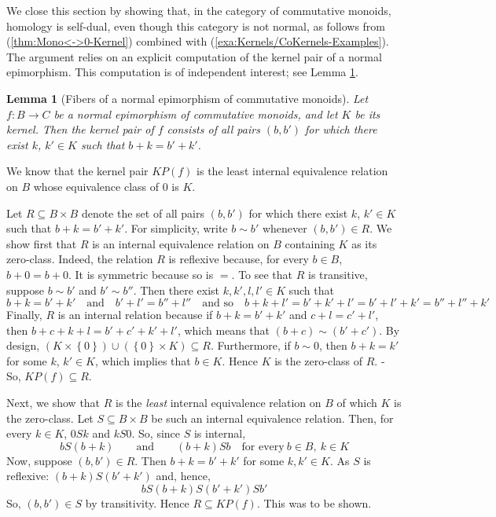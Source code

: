 \documentclass [12pt,oneside]{book}%
\makeatletter
\theoremstyle{captionstyle}  %
\newtheorem{lemma}[theorem]{Lemma}
\renewenvironment{proof}[1][\proofname]{\vspace{-2ex}\par       %
	\pushQED{\qed}%
	\normalfont \topsep6\p@\@plus6\p@\relax
	\trivlist
	\item[\hskip\labelsep
	            \color{proofcaption}\bfseries                %
	            #1\@addpunct{\quad}]\ignorespaces
}{%
	\popQED\endtrivlist\@endpefalse
}
\newcommand{\from}{\colon}				%
\newcommand{\Set}[1]{\left\{#1\right\}}		%
\newcommand{\union}{\cup}									%
\newcommand{\ZeroObject}{0}                           %
\newcommand{\Prdct}[2]{#1 \times #2}	 	%
\newcommand{\KrnlPr}[1]{\textit{KP}\left(#1\right)}			%
\makeatother
\begin{document}
We close this section by showing that, in the category of commutative monoids, homology is self-dual, even though this category is not normal, as follows from (\ref{thm:Mono<->0-Kernel}) combined with (\ref{exa:Kernels/CoKernels-Examples}). The argument relies on an explicit computation of the kernel pair of a normal epimorphism. This computation is of independent interest; see Lemma \ref{thm:FibersNormalEpiMorphismCommutativeMonoids}.

\begin{lemma}[Fibers of a normal epimorphism of commutative monoids]
    \label{thm:FibersNormalEpiMorphismCommutativeMonoids}
    Let $f\from B\to C$ be a normal epimorphism of commutative monoids, and let $K$	be its kernel. Then the kernel pair of $f$ consists of all pairs $(b,b')$ for which there exist $k$, $k'\in K$ such that $b+k=b'+k'$.
\end{lemma}
\begin{proof}
    We know that the kernel pair $\KrnlPr{f}$ is the least internal equivalence relation on $B$ whose equivalence class of $\ZeroObject$ is $K$.

    Let $R\subseteq \Prdct{B}{B}$ denote the set of all pairs $(b,b')$ for which there exist $k$, $k'\in K$ such that $b+k=b'+k'$. For simplicity, write $b\sim b'$ whenever $(b,b')\in R$. We show first that $R$ is an internal equivalence relation on $B$ containing $K$ as its zero-class. Indeed, the relation $R$ is reflexive because, for every $b\in B$, $b+0=b+0$. It is symmetric because so is $=$. To see that $R$ is transitive, suppose $b\sim b'$ and $b'\sim b''$. Then there exist $k,k',l,l'\in K$ such that
    \begin{equation*}
        b+k=b'+k'  \quad \text{and}\quad b'+l'=b''+l''  \quad \text{and so}\quad b+k+l'=b'+k'+l'=b'+l'+k'=b''+l''+k'
    \end{equation*}
    Finally, $R$ is an internal relation because if $b+k=b'+k'$ and $c+l=c'+l'$, then $b+c+k+l=b'+c'+k'+l'$, which means that $(b+c)\sim (b'+c')$. By design, $(\Prdct{K}{\Set{\ZeroObject}})\union (\Prdct{\Set{\ZeroObject}}{K})\subseteq R$. Furthermore, if $b\sim 0$, then $b+k=k'$ for some $k$, $k'\in K$, which implies that $b\in K$. Hence $K$ is the zero-class of $R$. - So, $\KrnlPr{f}\subseteq R$.

    Next, we show that $R$ is the \emph{least} internal equivalence relation on $B$ of which $K$ is the zero-class. Let $S\subseteq \Prdct{B}{B}$ be such an internal equivalence relation. Then, for every $k\in K$, $0Sk$ and $kS0$. So, since $S$ is internal,
    \begin{equation*}
        bS(b+k)  \qquad \text{and}\qquad (b+k)Sb\quad \text{for  every}\ b\in B,\ k\in K
    \end{equation*}
    Now, suppose $(b,b')\in R$. Then $b+k=b'+k'$ for some $k,k'\in K$. As $S$ is reflexive: $(b+k)S(b'+k')$ and, hence,
    \begin{equation*}
        bS(b+k)S(b'+k')Sb'
    \end{equation*}
    So, $(b,b')\in S$ by transitivity. Hence $R\subseteq \KrnlPr{f}$. This was to be shown.
\end{proof}
\end{document}
